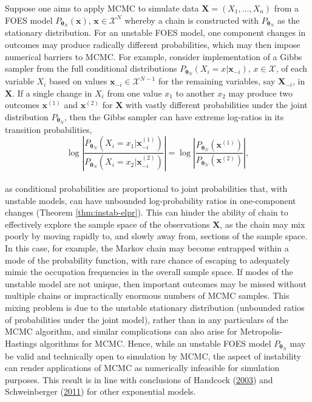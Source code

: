 \documentclass[]{article}
\theoremstyle{definition}
\begin{document}
Suppose one aims to apply MCMC to simulate data
\(\boldsymbol X=(X_1,\ldots,X_n)\) from a FOES model
\(P_{\boldsymbol \theta_N}(\boldsymbol x)\),
\(\boldsymbol x \in\mathcal{X}^N\) whereby a chain is constructed with
\(P_{\boldsymbol \theta_N}\) as the stationary distribution. For an
unstable FOES model, one component changes in outcomes may produce
radically different probabilities, which may then impose numerical
barriers to MCMC. For example, consider implementation of a Gibbs
sampler from the full conditional distributions
\(P_{\boldsymbol \theta_N} (X_i = x| \boldsymbol x_{-i})\),
\(x\in\mathcal{X}\), of each variable \(X_i\) based on values
\(\boldsymbol x_{-i}\in \mathcal{X}^{N-1}\) for the remaining variables,
say \(\boldsymbol X_{-i}\), in \(\boldsymbol X\). If a single change in
\(X_i\) from one value \(x_1\) to another \(x_2\) may produce two
outcomes \(\boldsymbol x^{(1)}\) and \(\boldsymbol x^{(2)}\) for
\(\boldsymbol X\) with vastly different probabilities under the joint
distribution \(P_{\boldsymbol \theta_N}\), then the Gibbs sampler can
have extreme log-ratios in its transition probabilities, \[
\log \left| \frac{P_{\boldsymbol \theta_N} (X_i =x_1 | \boldsymbol x^{(1)}_{-i})}{P_{\boldsymbol \theta_N} (X_i = x_2| \boldsymbol x^{(2)}_{-i}) } \right|=\log \left| \frac{P_{\boldsymbol \theta_N} ( \boldsymbol x^{(1)} )}{P_{\boldsymbol \theta_N} (  \boldsymbol x^{(2)} ) } \right|,
\]\\
as conditional probabilities are proportional to joint probabilities
that, with unstable models, can have unbounded log-probability ratios in
one-component changes (Theorem \ref{thm:instab-elpr}). This can hinder
the ability of chain to effectively explore the sample space of the
observations \(\boldsymbol X\), as the chain may mix poorly by moving
rapidly to, and slowly away from, sections of the sample space. In this
case, for example, the Markov chain may become entrapped within a mode
of the probability function, with rare chance of escaping to adequately
mimic the occupation frequencies in the overall sample space. If modes
of the unstable model are not unique, then important outcomes may be
missed without multiple chains or impractically enormous numbers of MCMC
samples. This mixing problem is due to the unstable stationary
distribution (unbounded ratios of probabilities under the joint model),
rather than in any particulars of the MCMC algorithm, and similar
complications can also arise for Metropolis-Hastings algorithms for
MCMC. Hence, while an unstable FOES model \(P_{\boldsymbol \theta_N}\)
may be valid and technically open to simulation by MCMC, the aspect of
instability can render applications of MCMC as numerically infeasible
for simulation purposes. This result is in line with conclusions of
Handcock (\protect\hyperlink{ref-handcock2003assessing}{2003}) and
Schweinberger
(\protect\hyperlink{ref-schweinberger2011instability}{2011}) for other
exponential models.
\end{document}
